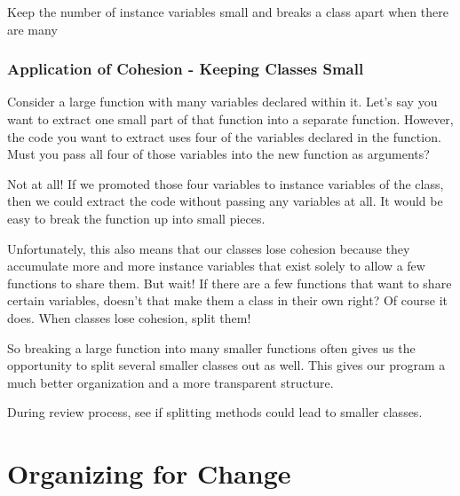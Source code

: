 \begin{marker}
Keep the number of instance variables small and breaks a class apart when there are many
\end{marker}

\subsubsection{Application of Cohesion - Keeping Classes Small}

Consider a large function with many variables declared within it. Let's say you
want to extract one small part of that function into a separate function. However, the code you want to extract uses four of the variables declared in the function. Must you pass all four of those variables into the new function as arguments?

Not at all! If we promoted those four variables to instance variables of the class, then we could extract the code without passing any variables at all. It would be easy to break the function up into small pieces.

Unfortunately, this also means that our classes lose cohesion because they accumulate more and more instance variables that exist solely to allow a few functions to share them. But wait! If there are a few functions that want to share certain variables, doesn't that make them a class in their own right? Of course it does. When classes lose cohesion, split them!

So breaking a large function into many smaller functions often gives us the opportunity to split several smaller classes out as well. This gives our program a much better organization and a more transparent structure.

\begin{marker}
During review process, see if splitting methods could lead to smaller classes.
\end{marker}

\section{Organizing for Change}